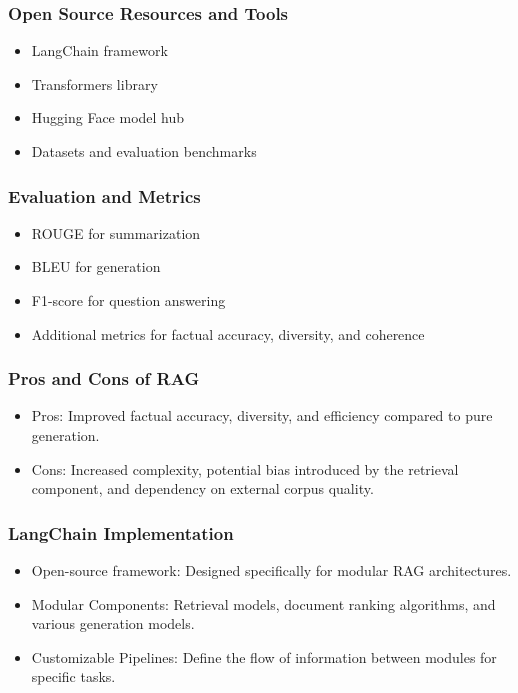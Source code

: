 \begin{frame}[fragile]\frametitle{Open Source Resources and Tools}

\begin{itemize}
\item LangChain framework
\item Transformers library
\item Hugging Face model hub
\item Datasets and evaluation benchmarks
\end{itemize}	

\end{frame}

\begin{frame}[fragile]\frametitle{Evaluation and Metrics}

\begin{itemize}
\item ROUGE for summarization
\item BLEU for generation
\item F1-score for question answering
\item Additional metrics for factual accuracy, diversity, and coherence
\end{itemize}	

\end{frame}

\begin{frame}[fragile]\frametitle{Pros and Cons of RAG}

\begin{itemize}
\item Pros: Improved factual accuracy, diversity, and efficiency compared to pure generation.
\item Cons: Increased complexity, potential bias introduced by the retrieval component, and dependency on external corpus quality.
\end{itemize}	

\end{frame}

\begin{frame}[fragile]\frametitle{LangChain Implementation}

\begin{itemize}
\item Open-source framework: Designed specifically for modular RAG architectures.
\item Modular Components: Retrieval models, document ranking algorithms, and various generation models.
\item Customizable Pipelines: Define the flow of information between modules for specific tasks.
\end{itemize}	

\end{frame}

